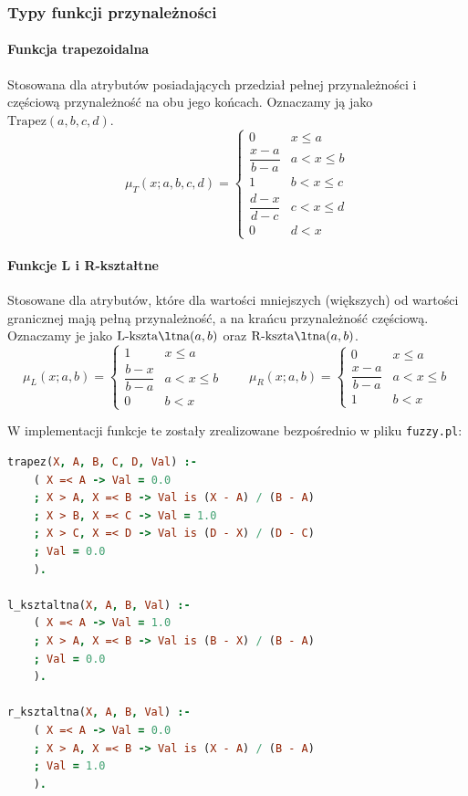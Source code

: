 \documentclass[11pt,a4paper]{article}
\newcommand{\code}[1]{\texttt{#1}}
\begin{document}
\subsubsection{Typy funkcji przynależności}
\paragraph{Funkcja trapezoidalna}
Stosowana dla atrybutów posiadających przedział pełnej przynależności i częściową
przynależność na obu jego końcach. Oznaczamy ją jako $\mathrm{Trapez}(a,b,c,d)$.
\begin{equation}
\mu_T(x;a,b,c,d)=
\begin{cases}
0 & x \le a\\[2pt]
\dfrac{x-a}{b-a} & a < x \le b\\[6pt]
1 & b < x \le c\\[2pt]
\dfrac{d-x}{d-c} & c < x \le d\\[6pt]
0 & d < x
\end{cases}
\end{equation}

\paragraph{Funkcje L i R-kształtne}
Stosowane dla atrybutów, które dla wartości mniejszych (większych) od wartości
granicznej mają pełną przynależność, a na krańcu przynależność częściową.
Oznaczamy je jako $\mathrm{L\text{-}kszta\l tna}(a,b)$ oraz
$\mathrm{R\text{-}kszta\l tna}(a,b)$.
\begin{equation}
\mu_L(x;a,b)=
\begin{cases}
1 & x \le a\\[2pt]
\dfrac{b-x}{b-a} & a < x \le b\\[6pt]
0 & b < x
\end{cases}
\qquad
\mu_R(x;a,b)=
\begin{cases}
0 & x \le a\\[2pt]
\dfrac{x-a}{b-a} & a < x \le b\\[6pt]
1 & b < x
\end{cases}
\end{equation}

W implementacji funkcje te zostały zrealizowane bezpośrednio w pliku
\code{fuzzy.pl}:

\begin{lstlisting}[language=Prolog,caption={Funkcje przynależności (\code{fuzzy.pl})}]
trapez(X, A, B, C, D, Val) :-
    ( X =< A -> Val = 0.0
    ; X > A, X =< B -> Val is (X - A) / (B - A)
    ; X > B, X =< C -> Val = 1.0
    ; X > C, X =< D -> Val is (D - X) / (D - C)
    ; Val = 0.0
    ).

l_ksztaltna(X, A, B, Val) :-
    ( X =< A -> Val = 1.0
    ; X > A, X =< B -> Val is (B - X) / (B - A)
    ; Val = 0.0
    ).

r_ksztaltna(X, A, B, Val) :-
    ( X =< A -> Val = 0.0
    ; X > A, X =< B -> Val is (X - A) / (B - A)
    ; Val = 1.0
    ).
\end{lstlisting}
\end{document}
